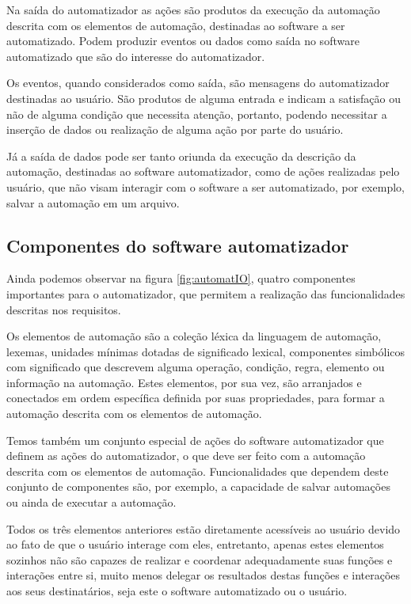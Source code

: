 \documentclass[tg]{mdtufsm}
\begin{document}
                Na saída do automatizador as ações são produtos da execução da automação descrita com os elementos de automação, destinadas ao software a ser automatizado. Podem produzir eventos ou dados como saída no software automatizado que são do interesse do automatizador.

                Os eventos, quando considerados como saída, são mensagens do automatizador destinadas ao usuário. São produtos de alguma entrada e indicam a satisfação ou não de alguma condição que necessita atenção, portanto, podendo necessitar a inserção de dados ou realização de alguma ação por parte do usuário.

                Já a saída de dados pode ser tanto oriunda da execução da descrição da automação, destinadas ao software automatizador, como de ações realizadas pelo usuário, que não visam interagir com o software a ser automatizado, por exemplo, salvar a automação em um arquivo.

                \subsection {Componentes do  software automatizador}

                    Ainda podemos observar na figura \ref{fig:automatIO}, quatro componentes importantes para o automatizador, que permitem a realização das funcionalidades descritas nos requisitos.

                    Os elementos de automação são a coleção léxica da linguagem de automação, lexemas, unidades mínimas dotadas de significado lexical, componentes simbólicos com significado que descrevem alguma operação, condição, regra, elemento ou informação na automação. Estes elementos, por sua vez, são arranjados e conectados em ordem específica definida por suas propriedades, para formar a automação descrita com os elementos de automação.

                    Temos também um conjunto especial de ações do software automatizador que definem as ações do automatizador, o que deve ser feito com a automação descrita com os elementos de automação. Funcionalidades que dependem deste conjunto de componentes são, por exemplo, a capacidade de salvar automações ou ainda de executar a automação.

                    Todos os três elementos anteriores estão diretamente acessíveis ao usuário devido ao fato de que o usuário interage com eles, entretanto, apenas estes elementos sozinhos não são capazes de realizar e coordenar adequadamente suas funções e interações entre si, muito menos delegar os resultados destas funções e interações aos seus destinatários, seja este o software automatizado ou o usuário.
\end{document}
